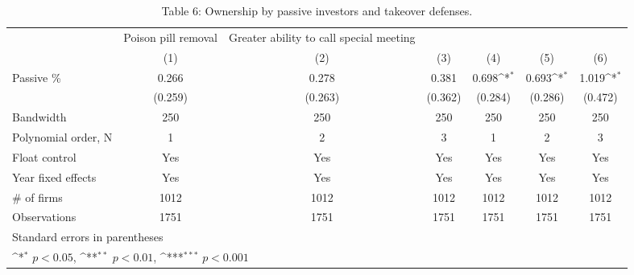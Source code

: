 \begin{table}[htbp]\centering
\def\sym#1{\ifmmode^{#1}\else\(^{#1}\)\fi}
\caption{Table 6: Ownership by passive investors and takeover defenses.}
\begin{tabular}{l*{6}{c}}
\hline\hline
                    &Poison pill removal         &Greater ability to call special meeting         &                     &                     &                     &                     \\
                    &\multicolumn{1}{c}{(1)}         &\multicolumn{1}{c}{(2)}         &\multicolumn{1}{c}{(3)}         &\multicolumn{1}{c}{(4)}         &\multicolumn{1}{c}{(5)}         &\multicolumn{1}{c}{(6)}         \\
\hline
Passive \%           &       0.266         &       0.278         &       0.381         &       0.698\sym{*}  &       0.693\sym{*}  &       1.019\sym{*}  \\
                    &     (0.259)         &     (0.263)         &     (0.362)         &     (0.284)         &     (0.286)         &     (0.472)         \\
\hline
Bandwidth           &         250         &         250         &         250         &         250         &         250         &         250         \\
Polynomial order, N &           1         &           2         &           3         &           1         &           2         &           3         \\
Float control       &         Yes         &         Yes         &         Yes         &         Yes         &         Yes         &         Yes         \\
Year fixed effects  &         Yes         &         Yes         &         Yes         &         Yes         &         Yes         &         Yes         \\
\# of firms          &        1012         &        1012         &        1012         &        1012         &        1012         &        1012         \\
Observations        &        1751         &        1751         &        1751         &        1751         &        1751         &        1751         \\
\hline\hline
\multicolumn{7}{l}{\footnotesize Standard errors in parentheses}\\
\multicolumn{7}{l}{\footnotesize \sym{*} \(p<0.05\), \sym{**} \(p<0.01\), \sym{***} \(p<0.001\)}\\
\end{tabular}
\end{table}
